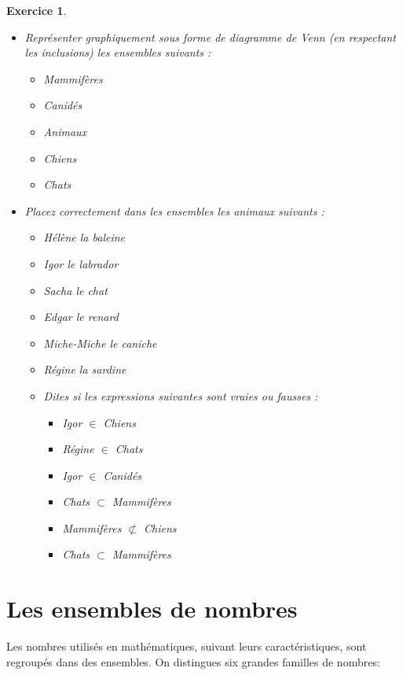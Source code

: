 \documentclass[10pt,a4paper]{book}
\newtheorem{exo}{Exercice}
\begin{document}
\begin{exo}
    \begin{itemize}
        \item Représenter graphiquement sous forme de diagramme de Venn (en respectant les inclusions) les ensembles suivants :
        \begin{itemize}
            \item Mammifères
            \item Canidés
            \item Animaux
            \item Chiens
            \item Chats
        \end{itemize}
    \item Placez correctement dans les ensembles les animaux suivants :
        \begin{itemize}
            \item Hélène la baleine
            \item Igor le labrador
            \item Sacha le chat
            \item Edgar le renard
            \item Miche-Miche le caniche
            \item Régine la sardine
    \item Dites si les expressions suivantes sont vraies ou fausses :
        \begin{itemize}
            \item Igor $\in$ Chiens
            \item Régine $\in$ Chats
            \item Igor $\in$ Canidés
            \item Chats $\subset$ Mammifères
            \item Mammifères $\not\subset$ Chiens
            \item Chats $\subset$ Mammifères
        \end{itemize} 
        \end{itemize}    
    \end{itemize}
\end{exo}



\section{Les ensembles de nombres}
Les nombres utilisés en mathématiques, suivant leurs caractéristiques, sont regroupés 
dans des ensembles. On distingues six grandes familles de nombres:
\end{document}

